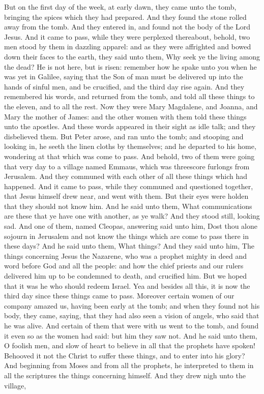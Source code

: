 But on the first day of the week, at early dawn, they came unto the tomb, bringing the spices which they had prepared. And they found the stone rolled away from the tomb. And they entered in, and found not the body of the Lord Jesus. And it came to pass, while they were perplexed thereabout, behold, two men stood by them in dazzling apparel: and as they were affrighted and bowed down their faces to the earth, they said unto them, Why seek ye the living among the dead? He is not here, but is risen: remember how he spake unto you when he was yet in Galilee, saying that the Son of man must be delivered up into the hands of sinful men, and be crucified, and the third day rise again. And they remembered his words, and returned from the tomb, and told all these things to the eleven, and to all the rest. Now they were Mary Magdalene, and Joanna, and Mary the mother of James: and the other women with them told these things unto the apostles. And these words appeared in their sight as idle talk; and they disbelieved them. But Peter arose, and ran unto the tomb; and stooping and looking in, he seeth the linen cloths by themselves; and he departed to his home, wondering at that which was come to pass.  And behold, two of them were going that very day to a village named Emmaus, which was threescore furlongs from Jerusalem. And they communed with each other of all these things which had happened. And it came to pass, while they communed and questioned together, that Jesus himself drew near, and went with them. But their eyes were holden that they should not know him. And he said unto them, What communications are these that ye have one with another, as ye walk? And they stood still, looking sad. And one of them, named Cleopas, answering said unto him, Dost thou alone sojourn in Jerusalem and not know the things which are come to pass there in these days? And he said unto them, What things? And they said unto him, The things concerning Jesus the Nazarene, who was a prophet mighty in deed and word before God and all the people: and how the chief priests and our rulers delivered him up to be condemned to death, and crucified him. But we hoped that it was he who should redeem Israel. Yea and besides all this, it is now the third day since these things came to pass. Moreover certain women of our company amazed us, having been early at the tomb; and when they found not his body, they came, saying, that they had also seen a vision of angels, who said that he was alive. And certain of them that were with us went to the tomb, and found it even so as the women had said: but him they saw not. And he said unto them, O foolish men, and slow of heart to believe in all that the prophets have spoken! Behooved it not the Christ to suffer these things, and to enter into his glory? And beginning from Moses and from all the prophets, he interpreted to them in all the scriptures the things concerning himself. And they drew nigh unto the village, 